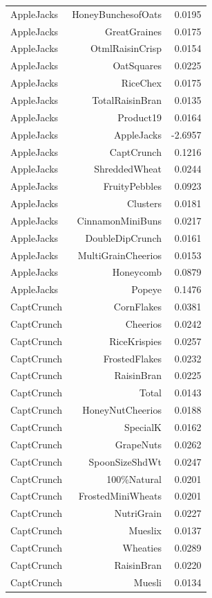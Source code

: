 \begin{longtable}{@{}lrr@{}}
AppleJacks & HoneyBunchesofOats & 0.0195 \\
AppleJacks & GreatGraines & 0.0175 \\
AppleJacks & OtmlRaisinCrisp & 0.0154 \\
AppleJacks & OatSquares & 0.0225 \\
AppleJacks & RiceChex & 0.0175 \\
AppleJacks & TotalRaisinBran & 0.0135 \\
AppleJacks & Product19 & 0.0164 \\
AppleJacks & AppleJacks & -2.6957 \\
AppleJacks & CaptCrunch & 0.1216 \\
AppleJacks & ShreddedWheat & 0.0244 \\
AppleJacks & FruityPebbles & 0.0923 \\
AppleJacks & Clusters & 0.0181 \\
AppleJacks & CinnamonMiniBuns & 0.0217 \\
AppleJacks & DoubleDipCrunch & 0.0161 \\
AppleJacks & MultiGrainCheerios & 0.0153 \\
AppleJacks & Honeycomb & 0.0879 \\
AppleJacks & Popeye & 0.1476 \\
CaptCrunch & CornFlakes & 0.0381 \\
CaptCrunch & Cheerios & 0.0242 \\
CaptCrunch & RiceKrispies & 0.0257 \\
CaptCrunch & FrostedFlakes & 0.0232 \\
CaptCrunch & RaisinBran & 0.0225 \\
CaptCrunch & Total & 0.0143 \\
CaptCrunch & HoneyNutCheerios & 0.0188 \\
CaptCrunch & SpecialK & 0.0162 \\
CaptCrunch & GrapeNuts & 0.0262 \\
CaptCrunch & SpoonSizeShdWt & 0.0247 \\
CaptCrunch & 100\%Natural & 0.0201 \\
CaptCrunch & FrostedMiniWheats & 0.0201 \\
CaptCrunch & NutriGrain & 0.0227 \\
CaptCrunch & Mueslix & 0.0137 \\
CaptCrunch & Wheaties & 0.0289 \\
CaptCrunch & RaisinBran & 0.0220 \\
CaptCrunch & Muesli & 0.0134 \\

\end{longtable}
